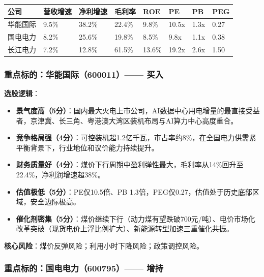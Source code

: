 \begin{exhibitbox}
\centering
\scriptsize
\setlength{\tabcolsep}{3pt}
\begin{tabularx}{\linewidth}{X C{1.4cm} C{1.4cm} C{1.2cm} C{1.0cm} C{1.1cm} C{1.0cm} C{1.0cm}}
\toprule
\textbf{公司} & \textbf{营收增速} & \textbf{净利增速} & \textbf{毛利率} & \textbf{ROE} & \textbf{PE} & \textbf{PB} & \textbf{PEG} \\
\midrule
华能国际 & 9.5\% & 38.2\% & 22.4\% & 9.8\% & 10.5x & 1.3x & 0.27 \\
国电电力 & 8.2\% & 25.6\% & 19.8\% & 8.5\% & 9.8x & 1.1x & 0.38 \\
长江电力 & 7.2\% & 12.8\% & 61.5\% & 13.6\% & 19.2x & 2.6x & 1.50 \\
\bottomrule
\end{tabularx}
\end{exhibitbox}

\subsubsection*{重点标的：华能国际（600011）—— 买入}

\textbf{选股逻辑}：
\vspace{0.2em}
\begin{itemize}[leftmargin=2em]
\item \textbf{景气度高（5分）}：国内最大火电上市公司，AI数据中心用电增量的最直接受益者，京津冀、长三角、粤港澳大湾区装机布局与AI算力中心高度重合。
\item \textbf{竞争格局强（4分）}：可控装机超1.2亿千瓦，市占率约8\%，在全国电力供需紧平衡背景下，行业地位和议价能力持续提升。
\item \textbf{财务质量好（4分）}：煤价下行周期中盈利弹性最大，毛利率从14\%回升至22.4\%，净利润增速超38\%。
\item \textbf{估值极低（5分）}：PE仅10.5倍、PB 1.3倍，PEG仅0.27，估值处于历史底部区域，安全边际极高。
\item \textbf{催化剂密集（5分）}：煤价继续下行（动力煤有望跌破700元/吨）、电价市场化改革突破（现货电价上浮比例扩大）、新能源转型加速三重催化共振。
\end{itemize}

\textbf{核心风险}：煤价反弹风险；利用小时下降风险；政策调控风险。

\subsubsection*{重点标的：国电电力（600795）—— 增持}

